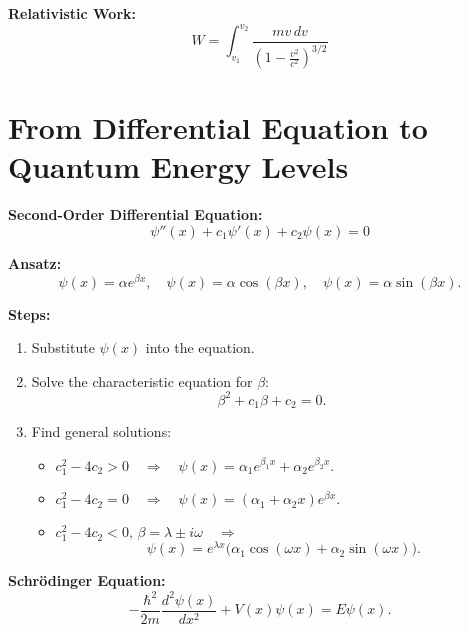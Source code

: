 \documentclass[a4paper,11pt]{article}
\renewcommand{\textbf}[1]{{\scriptsize	\bfseries #1}}
\begin{document}
\begin{footnotesize}
\begin{multicols}{2}
\begin{minipage}{\linewidth}
\end{minipage}



\begin{minipage}{\linewidth}

\textbf{Relativistic Work:} \\[-0.2cm]
\[
W = \int_{v_1}^{v_2} \frac{m v \, dv}{\left(1 - \frac{v^2}{c^2}\right)^{3/2}}
\]


\end{minipage}







\end{multicols}


\section*{From Differential Equation to Quantum Energy Levels}


\textbf{Second-Order Differential Equation:}
\[
\psi''(x) + c_1 \psi'(x) + c_2 \psi(x) = 0
\]

\textbf{Ansatz:}
\[
\psi(x) = \alpha e^{\beta x}, \quad \psi(x) = \alpha \cos(\beta x), \quad \psi(x) = \alpha \sin(\beta x).
\]

\textbf{Steps:}
\begin{enumerate}
    \item Substitute \(\psi(x)\) into the equation.
    \item Solve the characteristic equation for \(\beta\):
    \[
    \beta^2 + c_1 \beta + c_2 = 0.
    \]
    \item Find general solutions:
    \begin{itemize}
        \item \(c_1^2 - 4c_2 > 0 \quad \Rightarrow \quad \psi(x) = \alpha_1 e^{\beta_1 x} + \alpha_2 e^{\beta_2 x}.\)
        \item \(c_1^2 - 4c_2 = 0 \quad \Rightarrow \quad \psi(x) = (\alpha_1 + \alpha_2 x)e^{\beta x}.\)
        \item \(c_1^2 - 4c_2 < 0, \, \beta = \lambda \pm i\omega \quad \Rightarrow\)
        \[
        \psi(x) = e^{\lambda x} \big(\alpha_1 \cos(\omega x) + \alpha_2 \sin(\omega x)\big).
        \]
    \end{itemize}
\end{enumerate}

\textbf{Schrödinger Equation:}
\[
-\frac{\hbar^2}{2m} \frac{d^2 \psi(x)}{dx^2} + V(x)\psi(x) = E\psi(x).
\]


\end{footnotesize}
\end{document}
